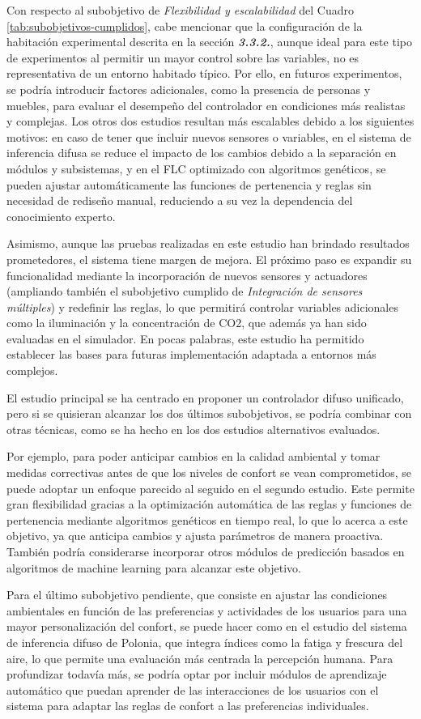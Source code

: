 Con respecto al subobjetivo de \textit{Flexibilidad y escalabilidad} del Cuadro \ref{tab:subobjetivos-cumplidos}, cabe mencionar que la configuración de la habitación experimental descrita en la sección \textbf{\textit{3.3.2.}}, aunque ideal para este tipo de experimentos al permitir un mayor control sobre las variables, no es representativa de un entorno habitado típico. Por ello, en futuros experimentos, se podría introducir factores adicionales, como la presencia de personas y muebles, para evaluar el desempeño del controlador en condiciones más realistas y complejas. Los otros dos estudios resultan más escalables debido a los siguientes motivos: en caso de tener que incluir nuevos sensores o variables, en el sistema de inferencia difusa se reduce el impacto de los cambios debido a la separación en módulos y subsistemas, y en el FLC optimizado con algoritmos genéticos, se pueden ajustar automáticamente las funciones de pertenencia y reglas sin necesidad de rediseño manual, reduciendo a su vez la dependencia del conocimiento experto.

Asimismo, aunque las pruebas realizadas en este estudio han brindado resultados prometedores, el sistema tiene margen de mejora. El próximo paso es expandir su funcionalidad mediante la incorporación de nuevos sensores y actuadores (ampliando también el subobjetivo cumplido de \textit{Integración de sensores múltiples}) y redefinir las reglas, lo que permitirá controlar variables adicionales como la iluminación y la concentración de CO2, que además ya han sido evaluadas en el simulador. En pocas palabras, este estudio ha permitido establecer las bases para futuras implementación adaptada a entornos más complejos.

El estudio principal se ha centrado en proponer un controlador difuso unificado, pero si se quisieran alcanzar los dos últimos subobjetivos, se podría combinar con otras técnicas, como se ha hecho en los dos estudios alternativos evaluados.

Por ejemplo, para poder anticipar cambios en la calidad ambiental y tomar medidas correctivas antes de que los niveles de confort se vean comprometidos, se puede adoptar un enfoque parecido al seguido en el segundo estudio. Este permite gran flexibilidad gracias a la optimización automática de las reglas y funciones de pertenencia mediante algoritmos genéticos en tiempo real, lo que lo acerca a este objetivo, ya que anticipa cambios y ajusta parámetros de manera proactiva. También podría considerarse incorporar otros módulos de predicción basados en algoritmos de machine learning para alcanzar este objetivo.

Para el último subobjetivo pendiente, que consiste en ajustar las condiciones ambientales en función de las preferencias y actividades de los usuarios para una mayor personalización del confort, se puede hacer como en el estudio del sistema de inferencia difuso de Polonia, que integra índices como la fatiga y frescura del aire, lo que permite una evaluación más centrada la percepción humana. Para profundizar todavía más, se podría optar por incluir módulos de aprendizaje automático que puedan aprender de las interacciones de los usuarios con el sistema para adaptar las reglas de confort a las preferencias individuales.

